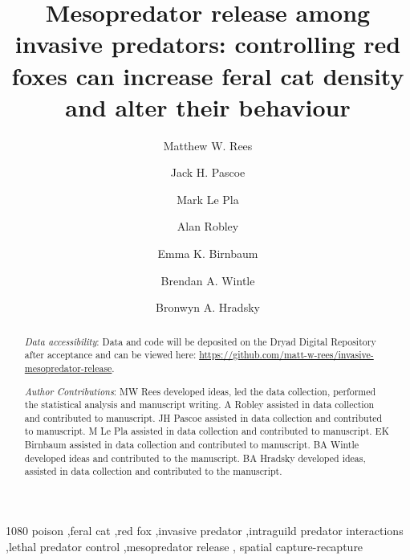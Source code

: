 \documentclass[preprint, 3p, authoryear]{elsarticle} %
\begin{document}
\begin{frontmatter}

  \title{Mesopredator release among invasive predators: controlling red foxes can increase feral cat density and alter their behaviour}
    \author[UOM]{Matthew W. Rees}
    \author[UOM,CEC]{Jack H. Pascoe}
  
    \author[UOM,CEC]{Mark Le Pla}
  
    \author[ARI]{Alan Robley}
  
    \author[CEC]{Emma K. Birnbaum}
  
    \author[UOM]{Brendan A. Wintle}
  
    \author[UOM]{Bronwyn A. Hradsky}
  
  
  \begin{abstract}
  \emph{Data accessibility}: Data and code will be deposited on the Dryad Digital Repository after acceptance and can be viewed here: \url{https://github.com/matt-w-rees/invasive-mesopredator-release}.

  \emph{Author Contributions}: MW Rees developed ideas, led the data collection, performed the statistical analysis and manuscript writing. A Robley assisted in data collection and contributed to manuscript. JH Pascoe assisted in data collection and contributed to manuscript. M Le Pla assisted in data collection and contributed to manuscript. EK Birnbaum assisted in data collection and contributed to manuscript. BA Wintle developed ideas and contributed to the manuscript. BA Hradsky developed ideas, assisted in data collection and contributed to the manuscript.
  \end{abstract}
    \begin{keyword}
    1080 poison \sep feral cat \sep red fox \sep invasive predator \sep intraguild predator interactions \sep lethal predator control \sep mesopredator release \sep 
    spatial capture-recapture
  \end{keyword}
  
 \end{frontmatter}
\end{document}
